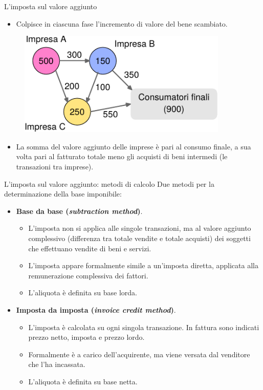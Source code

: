 \documentclass[aspectratio=149,11pt,italian]{beamer}
\begin{document}
\begin{frame}{L'imposta sul valore aggiunto}
\begin{itemize}
\item Colpisce in ciascuna fase l'\alert{incremento} di valore del bene scambiato.
\end{itemize}

\begin{figure}[htbp]
\centering
\includegraphics[width=10cm]{./figure/flussi-VA-metaflow-1.pdf}
\end{figure}

\begin{itemize}
\item La somma del valore aggiunto delle imprese è pari al consumo finale, a sua
volta pari al fatturato totale meno gli acquisti di beni intermedi (le
transazioni tra imprese).
\end{itemize}
\end{frame}

\begin{frame}{L'imposta sul valore aggiunto: metodi di calcolo}
Due metodi per la determinazione della base imponibile:
\begin{itemize}
\item \textbf{Base da base (\emph{subtraction method})}.
\begin{itemize}
\item L'imposta non si applica alle singole transazioni, ma al valore aggiunto
complessivo (differenza tra totale vendite e totale acquisti) dei soggetti
che effettuano vendite di beni e servizi.
\item L'imposta appare formalmente simile a un'imposta diretta, applicata alla
remunerazione complessiva dei fattori.
\item L'aliquota è definita \alert{su base lorda}.
\end{itemize}

\item \textbf{Imposta da imposta (\emph{invoice credit method})}.
\begin{itemize}
\item L'imposta è calcolata su ogni singola transazione. In fattura sono
indicati prezzo netto, imposta e prezzo lordo.
\item Formalmente è a carico dell'acquirente, ma viene versata dal venditore che
l'ha incassata.
\item L'aliquota è definita \alert{su base netta}.
\end{itemize}
\end{itemize}
\end{frame}
\end{document}
